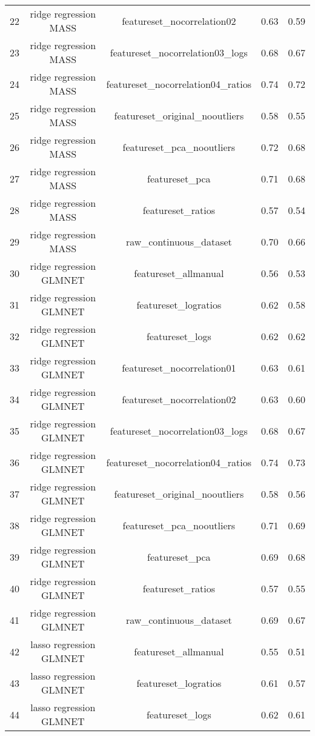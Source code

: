 \begin{tabular}{ccccc}
  22 & ridge regression MASS & featureset\_nocorrelation02 & 0.63 & 0.59 \\ 
  23 & ridge regression MASS & featureset\_nocorrelation03\_logs & 0.68 & 0.67 \\ 
  24 & ridge regression MASS & featureset\_nocorrelation04\_ratios & 0.74 & 0.72 \\ 
  25 & ridge regression MASS & featureset\_original\_nooutliers & 0.58 & 0.55 \\ 
  26 & ridge regression MASS & featureset\_pca\_nooutliers & 0.72 & 0.68 \\ 
  27 & ridge regression MASS & featureset\_pca & 0.71 & 0.68 \\ 
  28 & ridge regression MASS & featureset\_ratios & 0.57 & 0.54 \\ 
  29 & ridge regression MASS & raw\_continuous\_dataset & 0.70 & 0.66 \\ 
  30 & ridge regression GLMNET & featureset\_allmanual & 0.56 & 0.53 \\ 
  31 & ridge regression GLMNET & featureset\_logratios & 0.62 & 0.58 \\ 
  32 & ridge regression GLMNET & featureset\_logs & 0.62 & 0.62 \\ 
  33 & ridge regression GLMNET & featureset\_nocorrelation01 & 0.63 & 0.61 \\ 
  34 & ridge regression GLMNET & featureset\_nocorrelation02 & 0.63 & 0.60 \\ 
  35 & ridge regression GLMNET & featureset\_nocorrelation03\_logs & 0.68 & 0.67 \\ 
  36 & ridge regression GLMNET & featureset\_nocorrelation04\_ratios & 0.74 & 0.73 \\ 
  37 & ridge regression GLMNET & featureset\_original\_nooutliers & 0.58 & 0.56 \\ 
  38 & ridge regression GLMNET & featureset\_pca\_nooutliers & 0.71 & 0.69 \\ 
  39 & ridge regression GLMNET & featureset\_pca & 0.69 & 0.68 \\ 
  40 & ridge regression GLMNET & featureset\_ratios & 0.57 & 0.55 \\ 
  41 & ridge regression GLMNET & raw\_continuous\_dataset & 0.69 & 0.67 \\ 
  42 & lasso regression GLMNET & featureset\_allmanual & 0.55 & 0.51 \\ 
  43 & lasso regression GLMNET & featureset\_logratios & 0.61 & 0.57 \\ 
  44 & lasso regression GLMNET & featureset\_logs & 0.62 & 0.61 \\ 

\end{tabular}
